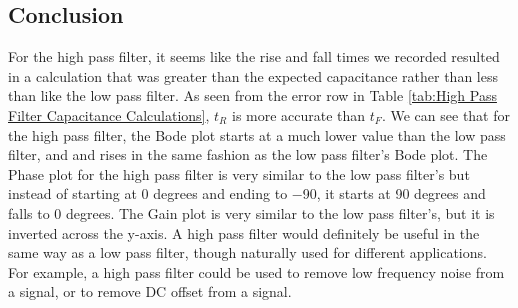 \documentclass{article}
\begin{document}
\subsection{Conclusion}
For the high pass filter, it seems like the rise and fall times we recorded resulted in a calculation that was greater than the expected capacitance rather than less than like the low pass filter. As seen from the error row in Table \ref{tab:High Pass Filter Capacitance Calculations}, $t_R$ is more accurate than $t_F$. We can see that for the high pass filter, the Bode plot starts at a much lower value than the low pass filter, and and rises in the same fashion as the low pass filter's Bode plot. The Phase plot for the high pass filter is very similar to the low pass filter's but instead of starting at 0 degrees and ending to $-$90, it starts at  90 degrees and falls to 0 degrees. The Gain plot is very similar to the low pass filter's, but it is inverted across the y-axis. A high pass filter would definitely be useful in the same way as a low pass filter, though naturally used for different applications. For example, a high pass filter could be used to remove low frequency noise from a signal, or to remove DC offset from a signal.
\vspace{-5mm}
\end{document}

